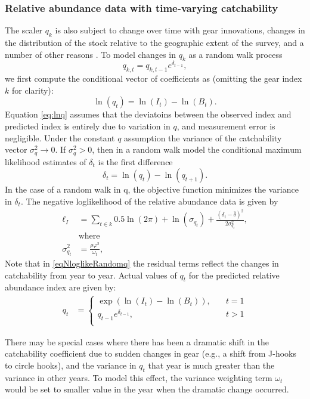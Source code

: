 \subsubsection{Relative abundance data with time-varying catchability}\label{qrandomwalk}
The scaler $q_k$ is also subject to change over time  with gear innovations, changes in the distribution of the stock relative to the geographic extent of the survey, and a number of other reasons \citep{wilberg2009incorporating}.  To model changes in $q_k$ as a random walk process \[q_{k,t} = q_{k,t-1} e^{\delta_{t-1}},\] we first compute the conditional vector of coefficients as (omitting the gear index $k$ for clarity):
\begin{equation}\label{eq:lnq}
	\ln(q_t)  = \ln(I_t) - \ln(B_t).
\end{equation}
Equation \eqref{eq:lnq} assumes that the deviatoins between the observed index and predicted index is entirely due to variation in $q$, and measurement error is negligible. Under the constant $q$ assumption the variance of the catchability vector $\sigma^2_q\rightarrow 0$. If $\sigma^2_q > 0$, then in a random walk model the conditional maximum likelihood estimates of $\delta_t$ is the first difference
\begin{equation}
	\delta_t = \ln(q_t) - \ln(q_{t+1}).
\end{equation}
In the case of a random walk in q, the objective function minimizes the variance in $\delta_t$.  The negative loglikelihood of the relative abundance data is given by
\begin{align}\label{eqNloglikeRandomq}
	\ell_I &=  \sum_{t\in k} 0.5 \ln(2 \pi) + \ln(\sigma_{q_t}) + \frac{(\delta_t-\bar{\delta})^2}{2 \sigma^2_{q_t}},\\
	&\mbox{where} \nonumber \\
	\sigma^2_{q_t} &= \frac{\rho \varphi^2}{ \omega_{t}},  \nonumber
\end{align}
Note that in \eqref{eqNloglikeRandomq} the residual terms reflect the changes in catchability from year to year.  Actual values of $q_t$ for the predicted relative abundance index are given by:
\begin{align}
	q_t &= 
	\begin{cases}
		\exp(\ln(I_t)-\ln(B_t)), \quad &t=1\\
		q_{t-1}e^{\delta_{t-1}}, \quad &t>1\\
	\end{cases}
\end{align}

There may be special cases where there has been a dramatic shift in the catchability coefficient due to sudden changes in gear (e.g., a shift from J-hooks to circle hooks), and the variance in $q_t$ that year is much greater than the variance in other years.  To model this effect, the variance weighting term $\omega_t$ would be set to smaller value in the year when the dramatic change occurred.

